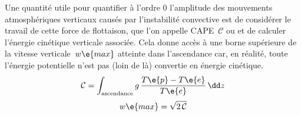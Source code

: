 \sk
Une quantité utile pour quantifier à l'ordre 0 l'amplitude des mouvements atmosphériques verticaux causés par l'instabilité convective est de considérer le travail de cette force de flottaison, que l'on appelle CAPE~$\mathcal{C}$ ou  et de calculer l'énergie cinétique verticale associée. Cela donne accès à une borne supérieure de la vitesse verticale~$w\e{max}$ atteinte dans l'ascendance car, en réalité, toute l'énergie potentielle n'est pas (loin de là) convertie en énergie cinétique.
\[ \mathcal{C} = \int_{\textrm{ascendance}}^{} g \, \frac{T\e{p}-T\e{e}}{T\e{e}} \, \dd z \]
\[ w\e{max} = \sqrt{2\,\mathcal{C}}  \]
